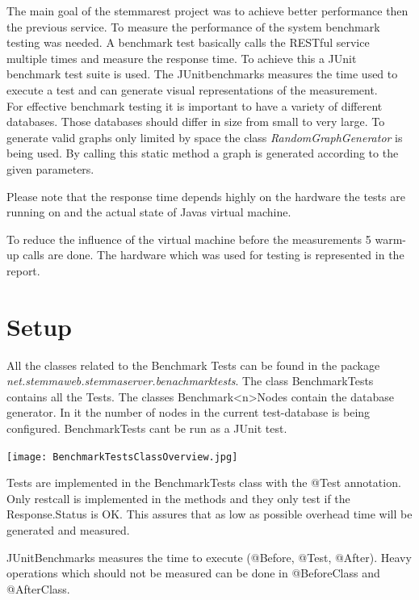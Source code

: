 \documentclass[11pt,fleqn,openany]{book} %
\begin{document}
The main goal of the stemmarest project was to achieve better performance then the previous service. To measure the performance of the system benchmark testing was needed. A benchmark test basically calls the RESTful service multiple times and measure the response time. To achieve this a JUnit benchmark test suite is used. The JUnitbenchmarks measures the time used to execute a test and can generate visual representations of the measurement.\\
For effective benchmark testing it is important to have a variety of different databases. Those databases should differ in size from small to very large.
To generate valid graphs only limited by space the class \textit{RandomGraphGenerator} is being used. By calling this static method a graph is generated according to the given parameters.\\
\begin{remark}
Please note that the response time depends highly on the hardware the tests are running on and the actual state of Javas virtual machine. 
\end{remark}
To reduce the influence of the virtual machine before the measurements 5 warm-up calls are done. The hardware which was used for testing is represented in the report.

\section*{Setup}
All the classes related to the Benchmark Tests can be found in the package \\ \textit{net.stemmaweb.stemmaserver.benachmarktests}. The class BenchmarkTests contains all the Tests. The classes Benchmark<n>Nodes contain the database generator. In it the number of nodes in the current test-database is being configured. BenchmarkTests cant be run as a JUnit test.

\begin{center}
\texttt{[image: BenchmarkTestsClassOverview.jpg]} 
\end{center}

Tests are implemented in the BenchmarkTests class with the @Test annotation. Only restcall is implemented in the methods and they only test if the Response.Status is OK. This assures that as low as possible overhead time will be generated and measured.

\begin{remark}
JUnitBenchmarks measures the time to execute (@Before, @Test, @After). Heavy operations which should not be measured can be done in @BeforeClass and @AfterClass.
\end{remark}
\end{document}
